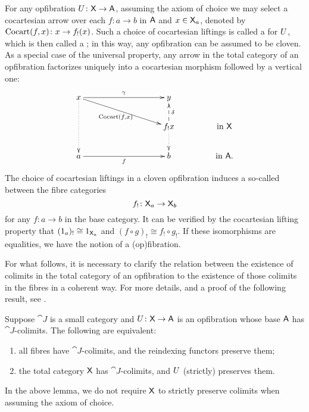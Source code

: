 \documentclass{amsart}
\begin{document}
For any opfibration $U\colon \mathsf{X} \to\mathsf{A}$, assuming the axiom of choice we may select a cocartesian arrow over each $f\colon a\to b$ in $\mathsf{A}$ and $x\in\mathsf{X}_a$, denoted by $\mathrm{Cocart}(f,x)\colon x\to f_!(x)$. Such a choice of cocartesian liftings is called a  for $U$, which is then called a ; in this way, any opfibration can be assumed to be cloven. As a special case of the universal property, any arrow in the total category of an opfibration factorizes uniquely into a cocartesian morphism followed by a vertical one:
\begin{equation}\label{factor}
\xymatrix @C=.6in @R=.3in
{x \ar @{.>}[dd]\ar[rr]^\gamma \ar[drr]_-{\Cocart(f,x)} && y &\\
&& f_!x \ar @{-->}[u]_-{\delta} \ar @{.>}[d] & \textrm{in }\X  \\
a\ar[rr]_-{f} && b & \textrm{in }\A.}
\end{equation}
The choice of cocartesian liftings in a cloven opfibration induces a so-called  between the fibre categories
\begin{equation}\label{reindexing}
 f_!\colon\mathsf{X}_a\to\mathsf{X}_b
\end{equation}
for any $f\colon a\to b$ in the base category. It can be verified by the cocartesian lifting property that $(1_a)_!\cong1_{\mathsf{X}_a}$ and $(f\circ g)_!\cong f_!\circ g_!$. If these isomorphisms are equalities, we have the notion of a  (op)fibration.

For what follows, it is necessary to clarify the relation between the existence of colimits in the total category of an opfibration to the existence of those colimits in the fibres in a coherent way. For more details, and a proof of the following result, see \cite[Cor. 3.7]{FibredAdjunctions}.

\begin{lem}\label{lem:fibrewiselimits}
  Suppose $\cat{J}$ is a small category and $U\colon\mathsf{X}\to\mathsf{A}$ is an
  opfibration whose base $\mathsf{A}$ has $\cat{J}$-colimits. The following
  are equivalent:
\begin{enumerate}
 \item all fibres have $\cat{J}$-colimits, and the reindexing functors preserve them; \label{it:2}
 \item the total category $\mathsf{X}$ has $\cat{J}$-colimits, and $U$ (strictly) preserves them.
\end{enumerate}
\end{lem}

\begin{remark}
  In the above lemma, we do not require $\mathsf{X}$ to strictly preserve colimits when assuming the axiom of choice. 
\end{remark}
\end{document}
